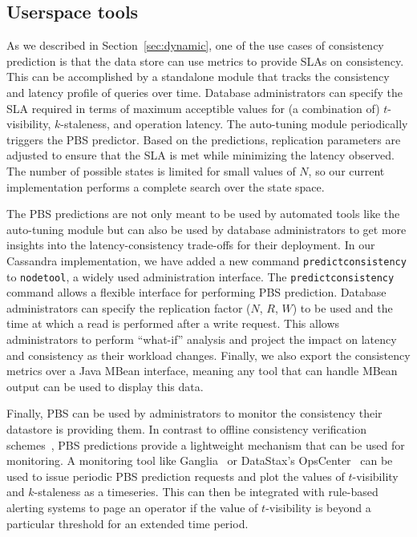 \subsection{Userspace tools}


As we described in Section~\ref{sec:dynamic}, one of the use cases of
consistency prediction is that the data store can use metrics to
provide SLAs on consistency. This can be accomplished by a standalone
module that tracks the consistency and latency profile of queries over
time. Database administrators can specify the SLA required in terms of
maximum acceptible values for (a combination of) $t$-visibility,
$k$-staleness, and operation latency. The auto-tuning module
periodically triggers the PBS predictor. Based on the predictions,
replication parameters are adjusted to ensure that the SLA is met
while minimizing the latency observed. The number of possible states
is limited for small values of $N$, so our current implementation
performs a complete search over the state space.

The PBS predictions are not only meant to be used by automated tools
like the auto-tuning module but can also be used by database administrators
to get more insights into the latency-consistency trade-offs for their
deployment. In our Cassandra implementation, we have added a new
command \texttt{predictconsistency} to \texttt{nodetool}, a widely
used administration interface.  The \texttt{predictconsistency}
command allows a flexible interface for performing PBS
prediction. Database administrators can specify the replication factor
($N$, $R$, $W$) to be used and the time at which a read is performed
after a write request. This allows administrators to perform ``what-if''
analysis and project the impact on latency and consistency as their
workload changes.  Finally, we also export the consistency metrics
over a Java MBean interface, meaning any tool that can handle MBean
output can be used to display this data.


Finally, PBS can be used by administrators to monitor the consistency their
datastore is providing them. In contrast to offline consistency
verification schemes~\cite{podc-hpl}, PBS predictions provide a
lightweight mechanism that can be used for monitoring. A monitoring
tool like Ganglia~\cite{massie2004ganglia} or DataStax's
OpsCenter~\cite{datastax-opscenter} can be used to issue periodic PBS
prediction requests and plot the values of $t$-visibility and
$k$-staleness as a timeseries. This can then be integrated with
rule-based alerting systems to page an operator if the value of
$t$-visibility is beyond a particular threshold for an extended time
period.



